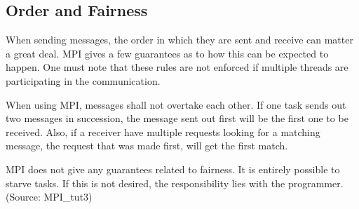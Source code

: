 \subsection{Order and Fairness}
When sending messages, the order in which they are sent and receive can matter a great deal. MPI gives a few guarantees as to how this can be expected to happen. One must note that these rules are not enforced if multiple threads are participating in the communication.

When using MPI, messages shall not overtake each other. If one task sends out two messages in succession, the message sent out first will be the first one to be received. Also, if a receiver have multiple requests looking for a matching message, the request that was made first, will get the first match.

MPI does not give any guarantees related to fairness. It is entirely possible to starve tasks. If this is not desired, the responsibility lies with the programmer.
(Source: MPI\_tut3)